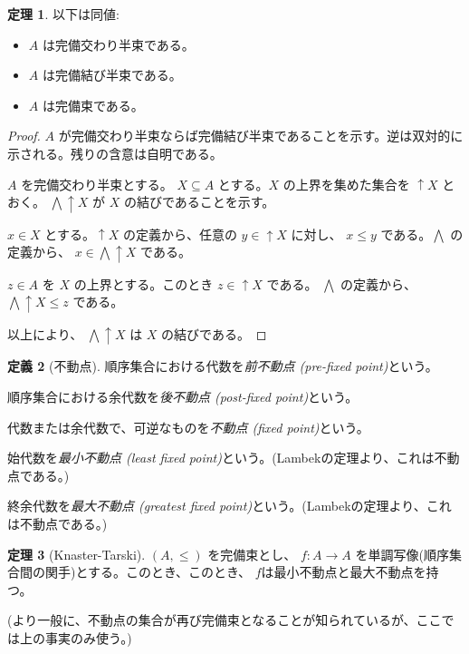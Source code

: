 \documentclass[dvipdfmx,uplatex,papersize,a4paper,10pt]{jsarticle}
\theoremstyle{definition}
\newtheorem{definition}{定義}[section]
\newtheorem{theorem}[definition]{定理}
\begin{document}
\begin{theorem}
  以下は同値:
  \begin{itemize}
    \item $A$ は完備交わり半束である。
    \item $A$ は完備結び半束である。
    \item $A$ は完備束である。
  \end{itemize}
\end{theorem}

\begin{proof}
  $A$ が完備交わり半束ならば完備結び半束であることを示す。逆は双対的に示される。残りの含意は自明である。

  $A$ を完備交わり半束とする。 $X \subseteq A$ とする。$X$ の上界を集めた集合を $\mathop{\uparrow} X$ とおく。 $\bigwedge \mathop{\uparrow} X$ が $X$ の結びであることを示す。

  $x \in X$ とする。$\mathop{\uparrow} X$ の定義から、任意の $y \in \mathop{\uparrow} X$ に対し、 $x \leq y$ である。$\bigwedge$ の定義から、 $x \in \bigwedge \mathop{\uparrow} X$ である。

  $z \in A$ を $X$ の上界とする。このとき $z \in \mathop{\uparrow} X$ である。 $\bigwedge$ の定義から、 $\bigwedge \mathop{\uparrow} X \leq z$ である。

  以上により、 $\bigwedge \mathop{\uparrow} X$ は $X$ の結びである。
\end{proof}

\begin{definition}[不動点]
  順序集合における代数を\emph{前不動点 (pre-fixed point)}という。

  順序集合における余代数を\emph{後不動点 (post-fixed point)}という。

  代数または余代数で、可逆なものを\emph{不動点 (fixed point)}という。

  始代数を\emph{最小不動点 (least fixed point)}という。(Lambekの定理より、これは不動点である。)

  終余代数を\emph{最大不動点 (greatest fixed point)}という。(Lambekの定理より、これは不動点である。)
\end{definition}

\begin{theorem}[Knaster-Tarski]
  $(A, \leq)$ を完備束とし、 $f \colon A \to A$ を単調写像(順序集合間の関手)とする。このとき、このとき、 $f$は最小不動点と最大不動点を持つ。

  (より一般に、不動点の集合が再び完備束となることが知られているが、ここでは上の事実のみ使う。)
\end{theorem}
\end{document}
